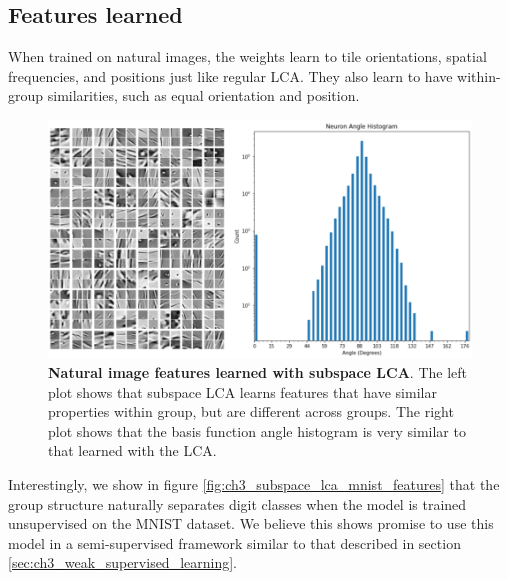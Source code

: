 \subsection{Features learned}
When trained on natural images, the weights learn to tile orientations, spatial frequencies, and positions just like regular LCA. They also learn to have within-group similarities, such as equal orientation and position.

\begin{figure}[h]
    \centering
    \includegraphics[width=\textwidth]{figures/subspace_lca_features.png}
    \caption{\textbf{Natural image features learned with subspace LCA}. The left plot shows that subspace LCA learns features that have similar properties within group, but are different across groups. The right plot shows that the basis function angle histogram is very similar to that learned with the LCA.}
    \label{fig:ch3_subspace_lca_features}
\end{figure}

Interestingly, we show in figure \ref{fig:ch3_subspace_lca_mnist_features} that the group structure naturally separates digit classes when the model is trained unsupervised on the MNIST dataset. We believe this shows promise to use this model in a semi-supervised framework similar to that described in section \ref{sec:ch3_weak_supervised_learning}.

